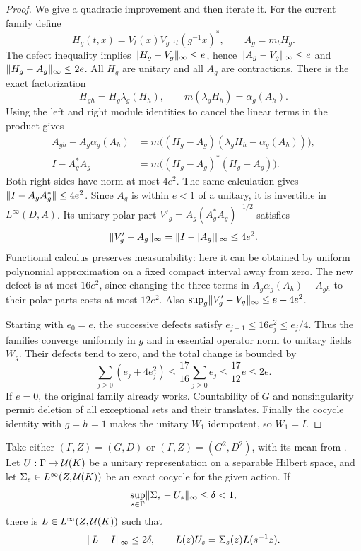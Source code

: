 \begin{proof}
We give a quadratic improvement and then iterate it.  For the current
family define
\[
 H_g(t,x)=V_t(x)V_{g^{-1}t}(g^{-1}x)^*,\qquad A_g=m_t H_g.
\]
The defect inequality implies $\lVert H_g-V_g\rVert_\infty\le e$, hence
$\lVert A_g-V_g\rVert_\infty\le e$ and
$\lVert H_g-A_g\rVert_\infty\le2e$.  All $H_g$ are unitary and all $A_g$
are contractions.  There is the exact factorization
\[
 H_{gh}=H_g\lambda_g(H_h),\qquad
 m(\lambda_g H_h)=\alpha_g(A_h).
\]
Using the left and right module identities to cancel the linear terms
in the product gives
\begin{align*}
 A_{gh}-A_g\alpha_g(A_h)
 &=m\bigl((H_g-A_g)(\lambda_g H_h-\alpha_g(A_h))\bigr),\\
 I-A_g^*A_g&=m\bigl((H_g-A_g)^*(H_g-A_g)\bigr).
\end{align*}
Both right sides have norm at most $4e^2$.  The same calculation gives
$\lVert I-A_gA_g^*\rVert\le4e^2$.  Since $A_g$ is within $e<1$ of a
unitary, it is invertible in $L^\infty(D,A)$.  Its unitary polar part
$V'_g=A_g(A_g^*A_g)^{-1/2}$ satisfies
\[
 \lVert V'_g-A_g\rVert_\infty
 =\lVert I-|A_g|\rVert_\infty\le4e^2.
\]
Functional calculus preserves measurability: here it can be obtained
by uniform polynomial approximation on a fixed compact interval away
from zero.  The new defect is at most $16e^2$, since changing the three
terms in $A_g\alpha_g(A_h)-A_{gh}$ to their polar parts costs at most
$12e^2$.  Also
$\sup_g\lVert V'_g-V_g\rVert_\infty\le e+4e^2$.

Starting with $e_0=e$, the successive defects satisfy
$e_{j+1}\le16e_j^2\le e_j/4$.  Thus the families converge uniformly in
$g$ and in essential operator norm to unitary fields $W_g$.  Their
defects tend to zero, and the total change is bounded by
\[
 \sum_{j\ge0}(e_j+4e_j^2)
 \le\frac{17}{16}\sum_{j\ge0}e_j
 \le\frac{17}{12}e\le2e.
\]
If $e=0$, the original family already works.  Countability of $G$
and nonsingularity permit deletion of all exceptional sets and their
translates.  Finally the cocycle identity with $g=h=1$ makes the
unitary $W_1$ idempotent, so $W_1=I$.
\end{proof}

\begin{lemma}\label{lem:boundary-intertwiner}
Take either $(\Gamma,Z)=(G,D)$ or
$(\Gamma,Z)=(G^2,D^2)$, with its mean from
.  Let $U:\Gamma\to\mathcal U(K)$ be a unitary
representation on a separable Hilbert space, and let
$\Sigma_s\in L^\infty(Z,\mathcal U(K))$ be an exact cocycle for the given
action.  If
\[
 \sup_{s\in\Gamma}\lVert\Sigma_s-U_s\rVert_\infty\le\delta<1,
\]
there is $L\in L^\infty(Z,\mathcal U(K))$ such that
\begin{equation}\label{eq:boundary-intertwiner}
 \lVert L-I\rVert_\infty\le2\delta,\qquad
 L(z)U_s=\Sigma_s(z)L(s^{-1}z).
\end{equation}
\end{lemma}

